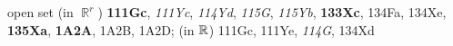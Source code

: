 open set (in $\BbbR^r$) {\bf 111Gc}, {\it 111Yc}, {\it 114Yd}, {\it 115G},
{\it 115Yb}, {\bf 133Xc}, 134Fa, 134Xe,
{\bf 135Xa}, {\bf 1A2A}, 1A2B, 1A2D;
  (in $\Bbb R$) 111Gc, 111Ye, {\it 114G}, 134Xd



















































































































































